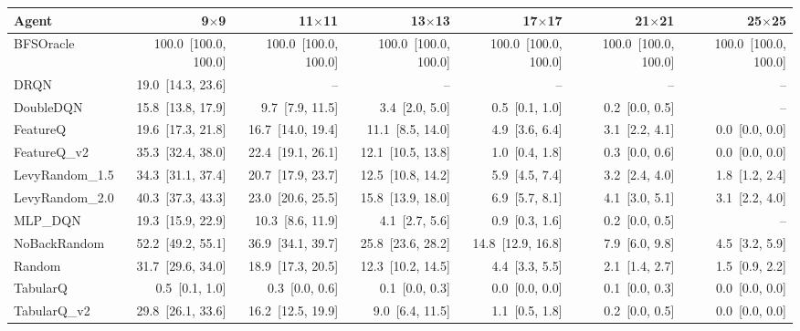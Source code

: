 \begin{tabular}{lrrrrrr}
\toprule
Agent & 9$\times$9 & 11$\times$11 & 13$\times$13 & 17$\times$17 & 21$\times$21 & 25$\times$25 \\
\midrule
BFSOracle & 100.0~[100.0, 100.0] & 100.0~[100.0, 100.0] & 100.0~[100.0, 100.0] & 100.0~[100.0, 100.0] & 100.0~[100.0, 100.0] & 100.0~[100.0, 100.0] \\
DRQN & 19.0~[14.3, 23.6] & -- & -- & -- & -- & -- \\
DoubleDQN & 15.8~[13.8, 17.9] & 9.7~[7.9, 11.5] & 3.4~[2.0, 5.0] & 0.5~[0.1, 1.0] & 0.2~[0.0, 0.5] & -- \\
FeatureQ & 19.6~[17.3, 21.8] & 16.7~[14.0, 19.4] & 11.1~[8.5, 14.0] & 4.9~[3.6, 6.4] & 3.1~[2.2, 4.1] & 0.0~[0.0, 0.0] \\
FeatureQ_v2 & 35.3~[32.4, 38.0] & 22.4~[19.1, 26.1] & 12.1~[10.5, 13.8] & 1.0~[0.4, 1.8] & 0.3~[0.0, 0.6] & 0.0~[0.0, 0.0] \\
LevyRandom_1.5 & 34.3~[31.1, 37.4] & 20.7~[17.9, 23.7] & 12.5~[10.8, 14.2] & 5.9~[4.5, 7.4] & 3.2~[2.4, 4.0] & 1.8~[1.2, 2.4] \\
LevyRandom_2.0 & 40.3~[37.3, 43.3] & 23.0~[20.6, 25.5] & 15.8~[13.9, 18.0] & 6.9~[5.7, 8.1] & 4.1~[3.0, 5.1] & 3.1~[2.2, 4.0] \\
MLP_DQN & 19.3~[15.9, 22.9] & 10.3~[8.6, 11.9] & 4.1~[2.7, 5.6] & 0.9~[0.3, 1.6] & 0.2~[0.0, 0.5] & -- \\
NoBackRandom & 52.2~[49.2, 55.1] & 36.9~[34.1, 39.7] & 25.8~[23.6, 28.2] & 14.8~[12.9, 16.8] & 7.9~[6.0, 9.8] & 4.5~[3.2, 5.9] \\
Random & 31.7~[29.6, 34.0] & 18.9~[17.3, 20.5] & 12.3~[10.2, 14.5] & 4.4~[3.3, 5.5] & 2.1~[1.4, 2.7] & 1.5~[0.9, 2.2] \\
TabularQ & 0.5~[0.1, 1.0] & 0.3~[0.0, 0.6] & 0.1~[0.0, 0.3] & 0.0~[0.0, 0.0] & 0.1~[0.0, 0.3] & 0.0~[0.0, 0.0] \\
TabularQ_v2 & 29.8~[26.1, 33.6] & 16.2~[12.5, 19.9] & 9.0~[6.4, 11.5] & 1.1~[0.5, 1.8] & 0.2~[0.0, 0.5] & 0.0~[0.0, 0.0] \\
\bottomrule
\end{tabular}